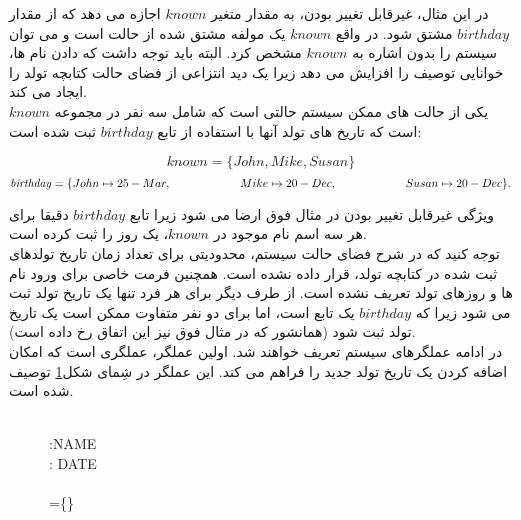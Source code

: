در این مثال، غیرقابل تغییر بودن، به مقدار متغیر $known$ اجازه می دهد که از مقدار  $birthday$ مشتق شود. در واقع $known$ یک مولفه مشتق شده از حالت است و می توان سیستم را بدون اشاره به $known$ مشخص کرد. البته باید توجه داشت که دادن نام ها، خوانایی توصیف را افزایش می دهد زیرا یک دید انتزاعی از فضای حالت کتابچه تولد را ایجاد می کند.
\\
یکی از حالت های ممکن سیستم حالتی است که شامل سه نفر در مجموعه $known$ است که تاریخ های تولد آنها با استفاده از تابع $birthday$ ثبت شده است:

\[
\mathit{known} = \{John, Mike, Susan\}
\]
\[
\mathit{birthday} = \{John\mapsto 25-Mar,\\
\hspace{60pt} Mike \mapsto 20-Dec,\\
\hspace{60pt} Susan \mapsto 20-Dec\}.\\
\]

ویژگی غیرقابل تغییر بودن در مثال فوق ارضا می شود زیرا تابع $birthday$ دقیقا برای هر سه اسم نام موجود در $known$، یک روز را ثبت کرده است.
\\
توجه کنید که در شرح فضای حالت سیستم، محدودیتی برای تعداد زمان تاریخ تولدهای ثبت شده در کتابچه تولد، قرار داده نشده است. همچنین فرمت خاصی برای ورود نام ها و روزهای تولد تعریف نشده است. از طرف دیگر برای هر فرد تنها یک تاریخ تولد ثبت می شود زیرا که $birthday$ یک تابع است، اما برای دو نفر متفاوت ممکن است یک تاریخ تولد ثبت شود (همانشور که در مثال فوق نیز این اتفاق رخ داده است).
\\
در ادامه عملگرهای سیستم تعریف خواهند شد. اولین عملگر، عملگری است که امکان اضافه کردن یک تاریخ تولد جدید را فراهم می کند. این عملگر در شِمای شکل\ref{AddBirthday} 
توصیف شده است.

\begin{figure}
\centering
\begin{schema}{}
\vartriangle {}\\
:NAME \\
: DATE \\
\ST
{} \notin {}\\
=\cup \{\mapsto {}\}
\end{schema}
\caption{}
\label{AddBirthday}
\end{figure}

